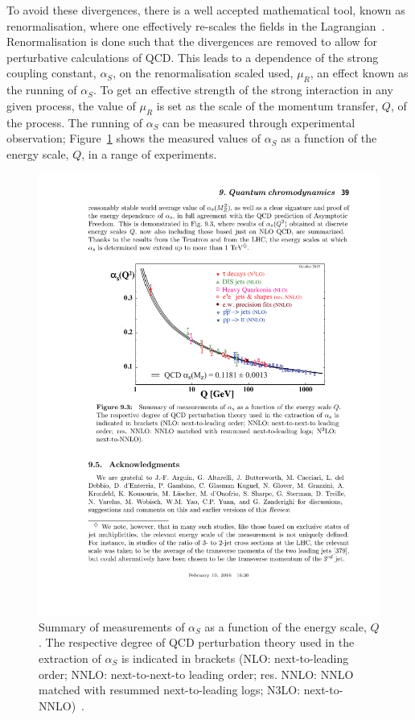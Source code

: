 To avoid these divergences, there is a well accepted mathematical tool, known as renormalisation,
where one effectively re-scales the fields in the Lagrangian~\cite{theo-qcd}.
Renormalisation is done such that the divergences are removed
to allow for perturbative calculations of QCD.
This leads to a dependence of the strong coupling constant, $\alpha_S$, on the renormalisation scaled used, $\mu_R$,
an effect known as the running of $\alpha_S$.
To get an effective strength of the strong interaction in any given process,
the value of $\mu_R$ is set as the scale of the momentum transfer, $Q$, of the process.
The running of $\alpha_{S}$ can be measured through experimental observation;
Figure~\ref{fig:theo-qcd_running} shows the measured values of $\alpha_S$
as a function of the energy scale, $Q$, in a range of experiments.

\begin{figure}[!hbt]
  \begin{center}
    \includegraphics[width=0.7\linewidth, angle=0]{figs/Theory/qcd_running.pdf}
  \end{center}
  \caption[Summary of measurements of $\alpha_S$ as a function of the energy scale, $Q$.]
          {Summary of measurements of $\alpha_S$ as a function of the energy scale, $Q$.
            The respective degree of QCD perturbation theory used in the extraction of $\alpha_S$ is indicated in brackets
            (NLO: next-to-leading order; NNLO: next-to-next-to leading order; res. NNLO: NNLO matched with resummed next-to-leading logs; N3LO: next-to-NNLO)~\cite{theo-qcd}.}
  \label{fig:theo-qcd_running}
\end{figure}

